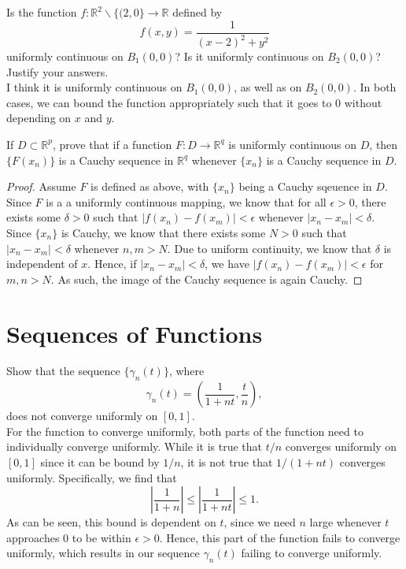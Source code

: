 \documentclass[12pt]{book}
\newcommand{\R}{\mathbb{R}}
\newenvironment{exercise}[2][Exercise]{\begin{trivlist}
\item[\hskip \labelsep {\bfseries #1}\hskip \labelsep {\bfseries #2.}]}{\end{trivlist}}
\begin{document}
\begin{exercise}{8.2.10}
Is the function $f: \R^2 \backslash \{ (2,0 \} \to \R$ defined  by
    \[ f(x,y) = \frac{1}{(x-2)^2 + y^2} \]
uniformly continuous on $B_1(0,0)$? Is it uniformly continuous on $B_2(0,0)$? Justify your answers. \\

I think it is uniformly continuous on $B_1 (0,0)$, as well as on $B_2 (0,0)$. In both cases, we can bound the function appropriately such that it goes to 0 without depending on $x$ and $y$.
\end{exercise}



\begin{exercise}{8.2.11}
If $D \subset \R^p$, prove that if a function $F:D \to \R^q$ is uniformly continuous on $D$, then $\{F(x_n)\}$ is a Cauchy sequence in $\R^q$ whenever $\{x_n\}$ is a Cauchy sequence in $D$.

\begin{proof}
    Assume $F$ is defined as above, with $\{x_n\}$ being a Cauchy sqeuence in $D$. Since $F$ is a a uniformly continuous mapping, we know that for all $\epsilon > 0$, there exists some $\delta>0$ such that $\left| f(x_n) - f(x_m) \right| < \epsilon$ whenever $ \left| x_n - x_m \right| < \delta$. Since $\{x_n\}$ is Cauchy, we know that there exists some $N>0$ such that $\left| x_n - x_m \right| < \delta$ whenever $n,m > N$. Due to uniform continuity, we know that $\delta$ is independent of $x$. Hence, if $\left| x_n - x_m \right| < \delta$, we have $\left| f(x_n) - f(x_m) \right| < \epsilon$ for $m,n > N$. As such, the image of the Cauchy sequence is again Cauchy.
\end{proof}
\end{exercise}




\section{Sequences of Functions}


\begin{exercise}{8.3.1}
Show that the sequence $\{\gamma_n(t)\}$, where 
    \[ \gamma_n(t) = \left( \frac{1}{1+n t}, \frac{t}{n} \right), \]
does not converge uniformly on $[0,1]$. \\

For the function to converge uniformly, both parts of the function need to individually converge uniformly. While it is true that $t/n$ converges uniformly on $[0,1]$ since it can be bound by $1/n$, it is not true that $1/(1+n t)$ converges uniformly. Specifically, we find that 
    \[ \left| \frac{1}{1+n} \right| \leq \left| \frac{1}{1+ n t} \right| \leq 1. \]
As can be seen, this bound is dependent on $t$, since we need $n$ large whenever $t$ approaches 0 to be within $\epsilon>0$. Hence, this part of the function fails to converge uniformly, which results in our sequence $\gamma_n (t)$ failing to converge uniformly.
\end{exercise}
\end{document}
